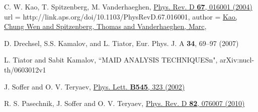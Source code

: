  C. W. Kao, T. Spitzenberg, M. Vanderhaeghen, \href{http://prd.aps.org/abstract/PRD/v67/i1/e016001}{Phys. Rev. D \textbf{67}, 016001 (2004)}       url = {http://link.aps.org/doi/10.1103/PhysRevD.67.016001}, author = {\href{http://link.aps.org/doi/10.1103/PhysRevD.67.016001}{Kao, Chung Wen and Spitzenberg, Thomas and Vanderhaeghen, Marc}},

 D. Drechsel, S.S. Kamalov, and L. Tiator, Eur. Phys. J. A \textbf{34}, 69–97 (2007)

 L. Tiator and Sabit Kamalov, “MAID ANALYSIS TECHNIQUESn", arXiv:nucl-th/0603012v1


 J. Soffer and O. V. Teryaev, \href{http://arxiv.org/pdf/hep-ph/0207252.pdf}{Phys. Lett. {\bf B545}, 323 (2002)}

 R. S. Pasechnik, J. Soffer and O. V. Teryaev, \href{http://arxiv.org/abs/1009.3355}{Phys. Rev. D \textbf{82}, 076007 (2010)}





